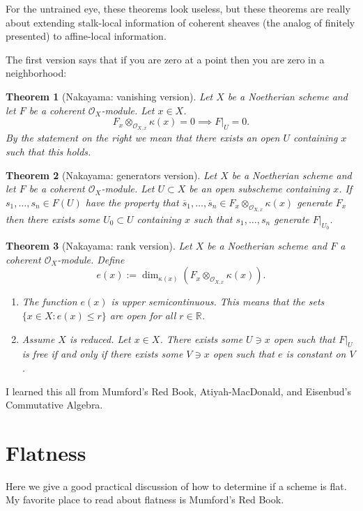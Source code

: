 \documentclass[12pt]{article}
\numberwithin{equation}{section}
\newtheorem{theorem}{Theorem}[subsection]
\theoremstyle{definition}
\theoremstyle{remark}
\newcommand{\RR}{\mathbb{R}}
\newcommand{\Ocal}{\mathcal{O}}
\begin{document}
For the untrained eye, these theorems look useless, but these theorems are really about extending stalk-local information of coherent sheaves (the analog of finitely presented) to affine-local information. 

The first version says that if you are zero at a point then you are zero in a neighborhood:
\begin{theorem}[Nakayama: vanishing version]\label{thm:nakayama-vanishing}
	Let $X$ be a Noetherian scheme and let $F$ be a coherent $\Ocal_X$-module. 
	Let $x\in X$. 
	$$F_x \otimes_{\Ocal_{X,x}}\kappa(x) =0 \implies F\vert_U =0. $$
	By the statement on the right we mean that there exists an open $U$ containing $x$ such that this holds.
\end{theorem}

\begin{theorem}[Nakayama: generators version]
	Let $X$ be a Noetherian scheme and let $F$ be a coherent $\Ocal_X$-module. 
	Let $U\subset X$ be an open subscheme containing $x$.
	If $s_1,\ldots,s_n \in F(U)$ have the property that $\overline{s}_1,\ldots,\overline{s}_n\in F_x\otimes_{\Ocal_{X,x}} \kappa(x)$ generate $F_x$ then there exists some $U_0 \subset U$ containing $x$ such that $s_1,\ldots,s_n$ generate $F\vert_{U_0}$.
\end{theorem}

\begin{theorem}[Nakayama: rank version]\label{thm:nakayama-rank}
	Let $X$ be a Noetherian scheme and $F$ a coherent $\Ocal_X$-module.
	Define 
	$$ e(x) := \dim_{\kappa(x)}\left( F_x \otimes_{\Ocal_{X,x}} \kappa(x) \right). $$
	\begin{enumerate}
		\item 	The function $e(x)$ is upper semicontinuous. 
		This means that the sets $ \lbrace x \in X \colon e(x)\leq r \rbrace$
		are open for all $r\in \RR$.
		\item Assume $X$ is reduced. 
		Let $x\in X$. 
		There exists some $U\owns x$ open such that $F\vert_U$ is free if and only if there exists some $V \owns x$ open such that $e$ is constant on $V$.
	\end{enumerate}
\end{theorem}
I learned this all from Mumford's Red Book, Atiyah-MacDonald, and Eisenbud's Commutative Algebra.


\section{Flatness}
Here we give a good practical discussion of how to determine if a scheme is flat. 
My favorite place to read about flatness is Mumford's Red Book.
\end{document}
